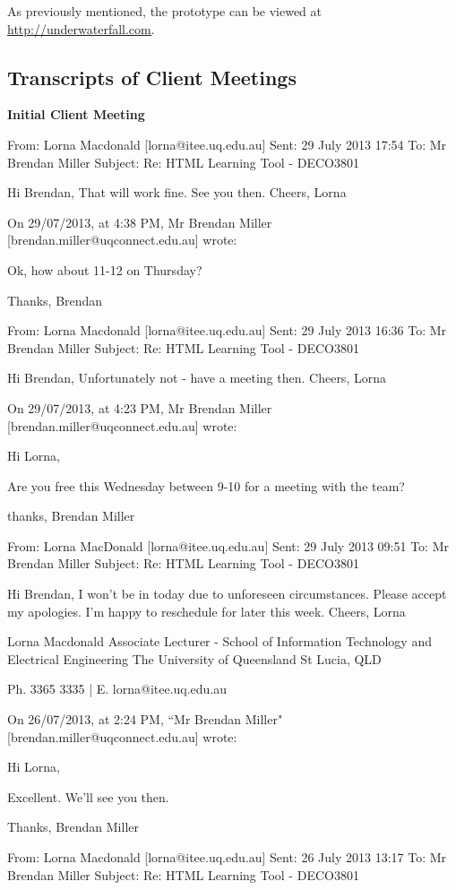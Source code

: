 \documentclass[12pt]{article}
\begin{document}
As previously mentioned, the prototype can be viewed at \underline{\url{http://underwaterfall.com}}.

\subsection*{Transcripts of Client Meetings}

{\bf Initial Client Meeting}

From: Lorna Macdonald [lorna@itee.uq.edu.au]
Sent: 29 July 2013 17:54
To: Mr Brendan Miller
Subject: Re: HTML Learning Tool - DECO3801
 
Hi Brendan,
That will work fine. See you then.
Cheers,
Lorna

On 29/07/2013, at 4:38 PM, Mr Brendan Miller [brendan.miller@uqconnect.edu.au] wrote:

Ok, how about 11-12 on Thursday?

Thanks,
Brendan

From: Lorna Macdonald [lorna@itee.uq.edu.au]
Sent: 29 July 2013 16:36
To: Mr Brendan Miller
Subject: Re: HTML Learning Tool - DECO3801
 
Hi Brendan,
Unfortunately not - have a meeting then.
Cheers,
Lorna

On 29/07/2013, at 4:23 PM, Mr Brendan Miller [brendan.miller@uqconnect.edu.au] wrote:

Hi Lorna,

Are you free this Wednesday between 9-10 for a meeting with the team?

thanks,
Brendan Miller

From: Lorna MacDonald [lorna@itee.uq.edu.au]
Sent: 29 July 2013 09:51
To: Mr Brendan Miller
Subject: Re: HTML Learning Tool - DECO3801
 
Hi Brendan,
I won't be in today due to unforeseen circumstances. Please accept my apologies. I'm happy to reschedule for later this week.
Cheers,
Lorna 

Lorna Macdonald
Associate Lecturer - School of Information Technology and Electrical Engineering
The University of Queensland
St Lucia, QLD 

Ph. 3365 3335  |  E. lorna@itee.uq.edu.au

On 26/07/2013, at 2:24 PM, ``Mr Brendan Miller" [brendan.miller@uqconnect.edu.au] wrote:

Hi Lorna,

Excellent. We'll see you then.

Thanks,
Brendan Miller

From: Lorna Macdonald [lorna@itee.uq.edu.au]
Sent: 26 July 2013 13:17
To: Mr Brendan Miller
Subject: Re: HTML Learning Tool - DECO3801
 
\end{document}
